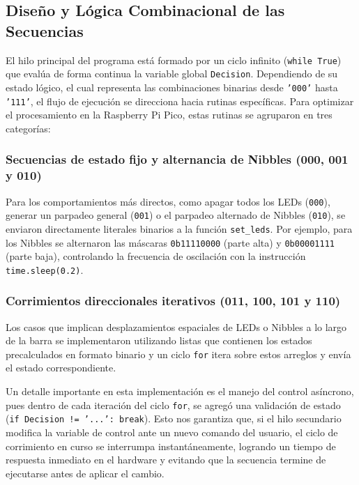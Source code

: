 \documentclass[letterpaper,12pt]{article}
\begin{document}
    \subsection{Diseño y Lógica Combinacional de las Secuencias}
    El hilo principal del programa está formado por un ciclo infinito (\texttt{while True}) que evalúa de forma continua la variable global \texttt{Decision}. Dependiendo de su estado lógico, el cual representa las combinaciones binarias desde \texttt{'000'} hasta \texttt{'111'}, el flujo de ejecución se direcciona hacia rutinas específicas. Para optimizar el procesamiento en la Raspberry Pi Pico, estas rutinas se agruparon en tres categorías:
    
    \subsubsection{Secuencias de estado fijo y alternancia de Nibbles (000, 001 y 010)}
    Para los comportamientos más directos, como apagar todos los LEDs (\texttt{000}), generar un parpadeo general (\texttt{001}) o el parpadeo alternado de Nibbles (\texttt{010}), se enviaron directamente literales binarios a la función \texttt{set\_leds}. Por ejemplo, para los Nibbles se alternaron las máscaras \texttt{0b11110000} (parte alta) y \texttt{0b00001111} (parte baja), controlando la frecuencia de oscilación con la instrucción \texttt{time.sleep(0.2)}.

    \subsubsection{Corrimientos direccionales iterativos (011, 100, 101 y 110)}
    Los casos que implican desplazamientos espaciales de LEDs o Nibbles a lo largo de la barra se implementaron utilizando listas que contienen los estados precalculados en formato binario y un ciclo \texttt{for} itera sobre estos arreglos y envía el estado correspondiente.
    
    Un detalle importante en esta implementación es el manejo del control asíncrono, pues dentro de cada iteración del ciclo \texttt{for}, se agregó una validación de estado (\texttt{if Decision != '...': break}). Esto nos garantiza que, si el hilo secundario modifica la variable de control ante un nuevo comando del usuario, el ciclo de corrimiento en curso se interrumpa instantáneamente, logrando un tiempo de respuesta inmediato en el hardware y evitando que la secuencia termine de ejecutarse antes de aplicar el cambio.
\end{document}

